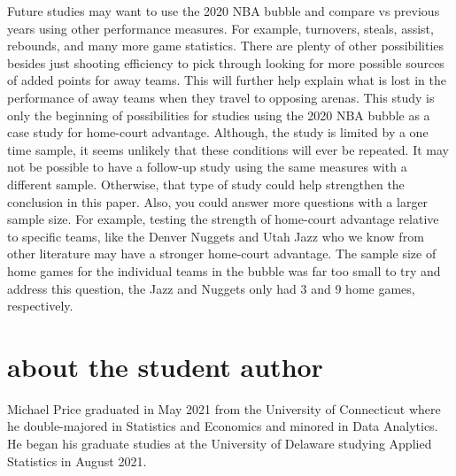 \documentclass[10pt]{article}
\begin{document}
Future studies may want to use the 2020 NBA bubble and compare vs previous years
using other performance measures. For example, turnovers, steals, assist, rebounds,
and many more game statistics. There are plenty of other possibilities besides
just shooting efficiency to pick through looking for more possible sources of
added points for away teams. This will further help explain what is lost in the
performance of away teams when they travel to opposing arenas. This study is only
the beginning of possibilities for studies using the 2020 NBA bubble as a case study
for home-court advantage. Although, the study is limited by a one time
sample, it seems unlikely that these conditions will ever be
repeated. It may not be possible to have a follow-up study using the
same measures with a different sample. Otherwise, that type of study
could help strengthen the conclusion in this paper. Also, you could
answer more questions with a larger sample size. For example, testing
the strength of home-court advantage relative to specific teams, like the
Denver Nuggets and Utah Jazz who we know from other literature may
have a stronger home-court advantage. The sample size of home games
for the individual teams in the bubble was far too small to try and
address this question, the Jazz and Nuggets only had 3 and 9 home
games, respectively.







\section*{about the student author}
Michael Price graduated in May 2021 from the University of Connecticut
where he double-majored in Statistics and Economics and minored in
Data Analytics. He began his graduate studies at the University of
Delaware studying Applied Statistics in August 2021.
\end{document}
